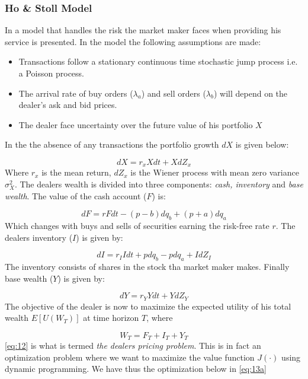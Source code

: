 \documentclass{kththesis}
\theoremstyle{definition}
\begin{document}
\subsubsection*{Ho \& Stoll Model}
In \textcite{ho1981optimal} a model that handles the risk the market maker faces when providing his service is presented. In the model the following assumptions are made:

\begin{itemize}
    \item Transactions follow a stationary continuous time stochastic jump process i.e. a Poisson process. 
    
    \item The arrival rate of buy orders ($\lambda_a$) and sell orders ($\lambda_b$) will depend on the dealer's ask and bid prices.
    
    \item The dealer face uncertainty over the future value of his portfolio $X$
\end{itemize}
In the the absence of any transactions the portfolio growth $dX$ is given below:

\begin{equation}
    \label{eq:8}
    dX = r_{x}Xdt + XdZ_x
\end{equation}
Where $r_x$ is the mean return, $dZ_x$ is the Wiener process with mean zero variance $\sigma^{2}_X$. The dealers wealth is divided into three components: \textit{cash, inventory} and \textit{base wealth}. The value of the cash account ($F$) is:

\begin{equation}
    \label{eq:9}
    dF = rFdt- (p-b)dq_b + (p+a)dq_a
\end{equation}
Which changes with buys and sells of securities earning the risk-free rate $r$. The dealers inventory ($I$) is given by:

\begin{equation}
    \label{eq:10}
    dI = r_{I}Idt+pdq_{b} - pdq_{a} + IdZ_{I}
\end{equation}
The inventory consists of shares in the stock tha market maker makes.
Finally base wealth ($Y$) is given by:

\begin{equation}
    \label{eq:11}
    dY = r_{Y}Ydt+YdZ_{Y} 
\end{equation}
The objective of the dealer is now to maximize the expected utility of his total wealth $E[U(W_T)]$ at time horizon $T$, where 

\begin{equation}
    \label{eq:12}
    W_{T} = F_{T} + I_{T} + Y_{T}
\end{equation}
\autoref{eq:12} is what is termed \textit{the dealers pricing problem}. This is in fact an optimization problem where we want to maximize the value function $J(\cdot)$ using dynamic programming. We have thus the optimization below in \autoref{eq:13a}
\end{document}
